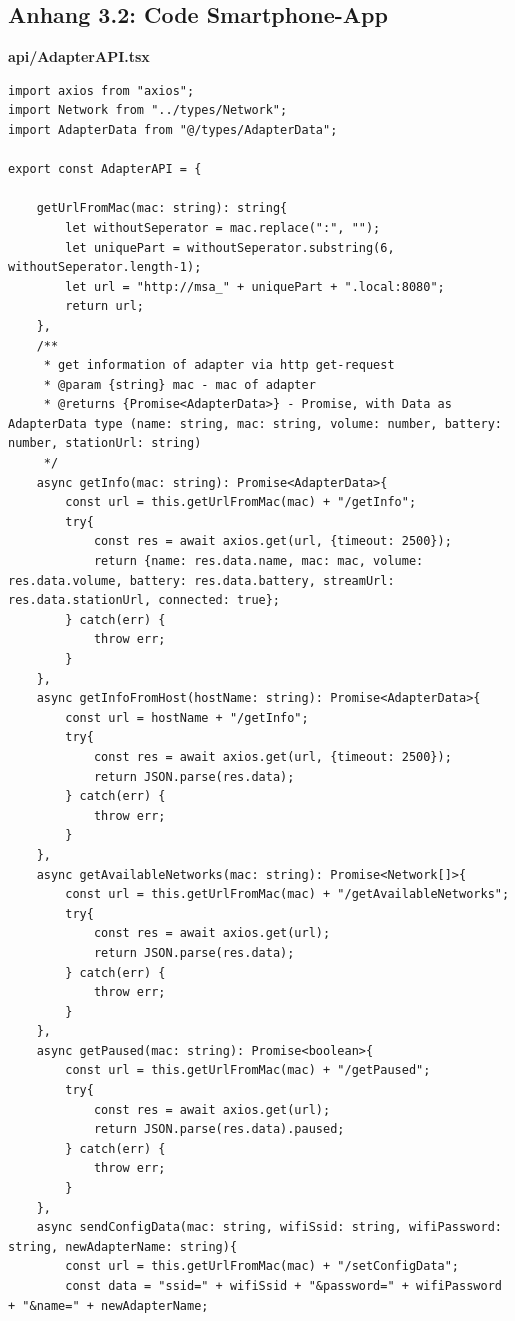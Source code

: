\documentclass[11pt, twoside]{article}
\begin{document}
\subsection{Anhang 3.2: Code Smartphone-App}
\textbf{api/AdapterAPI.tsx}
\begin{lstlisting}
import axios from "axios";
import Network from "../types/Network";
import AdapterData from "@/types/AdapterData";

export const AdapterAPI = {
    
    getUrlFromMac(mac: string): string{
        let withoutSeperator = mac.replace(":", "");
        let uniquePart = withoutSeperator.substring(6, withoutSeperator.length-1);
        let url = "http://msa_" + uniquePart + ".local:8080";
        return url;
    },
    /**
     * get information of adapter via http get-request
     * @param {string} mac - mac of adapter
     * @returns {Promise<AdapterData>} - Promise, with Data as AdapterData type (name: string, mac: string, volume: number, battery: number, stationUrl: string)
     */ 
    async getInfo(mac: string): Promise<AdapterData>{
        const url = this.getUrlFromMac(mac) + "/getInfo";
        try{
            const res = await axios.get(url, {timeout: 2500});
            return {name: res.data.name, mac: mac, volume: res.data.volume, battery: res.data.battery, streamUrl: res.data.stationUrl, connected: true};
        } catch(err) {
            throw err;
        }
    },
    async getInfoFromHost(hostName: string): Promise<AdapterData>{
        const url = hostName + "/getInfo";
        try{
            const res = await axios.get(url, {timeout: 2500});
            return JSON.parse(res.data);
        } catch(err) {
            throw err;
        }
    },
    async getAvailableNetworks(mac: string): Promise<Network[]>{
        const url = this.getUrlFromMac(mac) + "/getAvailableNetworks";
        try{
            const res = await axios.get(url);
            return JSON.parse(res.data);
        } catch(err) {
            throw err;
        }
    },
    async getPaused(mac: string): Promise<boolean>{
        const url = this.getUrlFromMac(mac) + "/getPaused";
        try{
            const res = await axios.get(url);
            return JSON.parse(res.data).paused;
        } catch(err) {
            throw err;
        }
    },
    async sendConfigData(mac: string, wifiSsid: string, wifiPassword: string, newAdapterName: string){
        const url = this.getUrlFromMac(mac) + "/setConfigData";
        const data = "ssid=" + wifiSsid + "&password=" + wifiPassword + "&name=" + newAdapterName;

\end{lstlisting}
\end{document}
